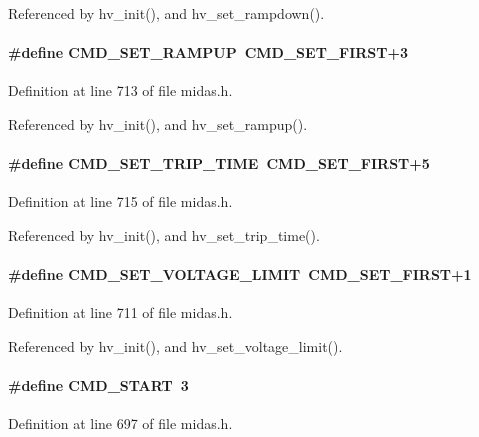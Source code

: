 Referenced by hv\_\-init(), and hv\_\-set\_\-rampdown().
\paragraph[{CMD\_\-SET\_\-RAMPUP}]{\setlength{\rightskip}{0pt plus 5cm}\#define CMD\_\-SET\_\-RAMPUP~CMD\_\-SET\_\-FIRST+3}\hfill\label{group__err26_gaf8be6c837a47b6de4d00bdd64db319cd}


Definition at line 713 of file midas.h.

Referenced by hv\_\-init(), and hv\_\-set\_\-rampup().
\paragraph[{CMD\_\-SET\_\-TRIP\_\-TIME}]{\setlength{\rightskip}{0pt plus 5cm}\#define CMD\_\-SET\_\-TRIP\_\-TIME~CMD\_\-SET\_\-FIRST+5}\hfill\label{group__err26_ga777213a0f7da75a6faf4ca53623a80c6}


Definition at line 715 of file midas.h.

Referenced by hv\_\-init(), and hv\_\-set\_\-trip\_\-time().
\paragraph[{CMD\_\-SET\_\-VOLTAGE\_\-LIMIT}]{\setlength{\rightskip}{0pt plus 5cm}\#define CMD\_\-SET\_\-VOLTAGE\_\-LIMIT~CMD\_\-SET\_\-FIRST+1}\hfill\label{group__err26_ga847a3b931dbb2facfceca2ff1e5be9a5}


Definition at line 711 of file midas.h.

Referenced by hv\_\-init(), and hv\_\-set\_\-voltage\_\-limit().
\paragraph[{CMD\_\-START}]{\setlength{\rightskip}{0pt plus 5cm}\#define CMD\_\-START~3}\hfill\label{group__err26_gab905e6aff2332984df0552c6b50203f2}


Definition at line 697 of file midas.h.

